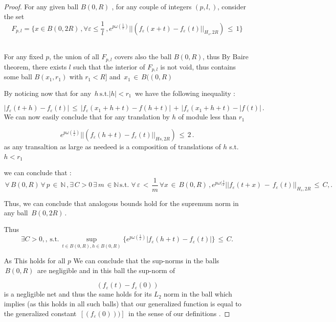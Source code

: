 \documentclass[12pt,a4paper]{amsart}
\newcommand{\NN}{\mathbb N}
\begin{document}
\begin{proof}
 For any given ball $B(0,R)$ , for any couple  of integers 
 $(p,l,)$, consider the set 
$$F_{p,l}= \{x\in B(0,2R)\,,\forall \varepsilon \leq \frac{1}{l}\,,
e^{p\omega(\frac{1}{\varepsilon})} ||(f_\varepsilon(x+t)-f_\varepsilon (t) ||_{H_s,2R})\,
\leq\,1\}$$\



For any fixed $p$, the union of all $F_{p,l}$  covers also the ball $B(0,R)$,  thus By Baire theorem, there exists $l$ such that the interior of $F_{p,l}$ is not void, thus contains some ball $B(x_1,r_1)$ with $r_1< R $] and
 $\,x_1\,\in \,B((0,R)\,$

By noticing now that for any
 $\,h\,\mbox{s.t.}|h|<r_1\,$ we have the following inequality :

$$|f_\varepsilon (t+h)-f_\varepsilon(t)|\,\leq\,
|f_\varepsilon(x_1+h+t)-f(h+t)|
\,+\,|f_\varepsilon (x_1+h+t)-|f(t)|\,.$$ We can now easily conclude that for any translation by $h$ of module less than
 $r_1$

$$e^{p\omega(\frac{1}{\varepsilon})}||(f_\varepsilon(h+t)-f_\varepsilon (t) ||_{Hs,2R})\,\leq\,2 \,.$$ as any transaltion as large as needeed is a composition of translations of $h$ s.t. $h<r_1$ 

we can conclude  that :
$$\,\forall \,B(0,R)\,\forall\,p\,\in \,\NN\,,\exists\, C>0 \,\exists \,m\,\in \NN \,\mbox{s.t.}\,
\,\forall \,\varepsilon \,<\,\frac{1}{m}\,\forall x\,\in\,B(0,R)\,,
e^{p\omega(\frac{1}{\varepsilon}}||f_\varepsilon(t+x)\,-\,
f_\varepsilon(t) ||_{H_s,2R}\,\leq\,C,.$$

  Thus, we can conclude that analogous bounds hold for the supremum norm  in any ball $\,B(0,2R)\,.$

Thus 
\begin{equation*}
\exists C>0,,\ \mbox{s.t.}\,\sup_{t\in B(0,R),h\in B(0,R)}
\{e^{p\omega(\frac{1}{\varepsilon})}
|f_\varepsilon(h+t)-f_\varepsilon (t) |\}
\,\leq\,C.
\end{equation*}


As This holds for all $p$
We can  conclude that the sup-norms in the balls
$\,B(0,R)\,$  are negligible and in this ball the sup-norm of

 $$\,(f_\varepsilon(t) - f_\varepsilon(0)) $$
 is a negligible net and thus the same holds for its  $L_2$ norm 
 in the ball which implies (as this holds in all such balls) that our generalized function is equal to the generalized constant 
 $\,[(f_\varepsilon(0)))]\,$ in the sense of our definitions .
  
 




\end{proof}
\end{document}
